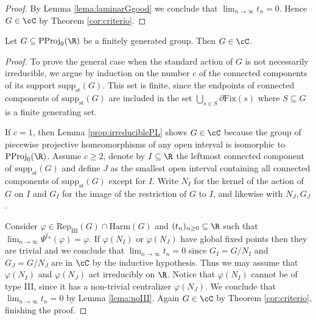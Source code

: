 \documentclass[reqno]{amsart}
\begin{document}
\begin{proof}
By Lemma \ref{lema:laminarGgood} we conclude that $\lim_{n \to \infty} t_n = 0$. Hence $G \in \cC$ by Theorem \ref{cor:criterio}.
\end{proof}

\begin{cor} \label{cor:PL}
Let $G \subseteq \mathrm{PProj}_0(\R)$ be a finitely generated group. Then $G \in \cC$.%
\end{cor}
\begin{proof}
To prove the general case when the standard action of $G$ is not necessarily irreducible, we argue by induction on the number $c$ of the connected components of its support $\mathrm{supp}_\mathrm{st}(G)$. This set is finite, since the endpoints of connected components of $\mathrm{supp}_\mathrm{st}(G)$ are included in the set $\bigcup_{s \in S} \partial \mathrm{Fix}(s)$ where $S \subseteq G$ is a finite generating set.

If $c = 1$, then Lemma \ref{prop:irreduciblePL} shows $G \in \cC$ because the group of piecewise projective homeomorphisms of any open interval is isomorphic to $\mathrm{PProj}_0(\R)$. Assume $c \geq 2$, denote by $I \subseteq \R$ the leftmost connected component of $\mathrm{supp}_\mathrm{st}(G)$ and define $J$ as the smallest open interval containing all connected components of $\mathrm{supp}_\mathrm{st}(G)$ except for $I$. Write $N_I$ for the kernel of the action of $G$ on $I$ and $G_I$ for the image of the restriction of $G$ to $I$, and likewise with $N_J, G_J$.

Consider $\varphi \in \mathrm{Rep}_\mathrm{III}(G) \cap \mathrm{Harm}(G)$ and $(t_n)_{n \geq 0} \subseteq \R$ such that $\lim_{n \to \infty} \Psi^{t_n}(\varphi) = \varphi$. If $\varphi(N_I)$ or $\varphi(N_J)$ have global fixed points then they are trivial and we conclude that $\lim_{n \to \infty} t_n = 0$ since $G_I = G/N_I$ and $G_J = G/N_J$ are in $\cC$ by the inductive hypothesis. Thus we may assume that $\varphi(N_I)$ and $\varphi(N_J)$ act irreducibly on $\R$. Notice that $\varphi(N_I)$ cannot be of type III, since it has a non-trivial centralizer $\varphi(N_J)$. We conclude that $\lim_{n \to \infty} t_n  = 0$ by Lemma \ref{lema:noIII}. Again $G \in \cC$ by Theorem \ref{cor:criterio}, finishing the proof. %
\end{proof}
\end{document}
